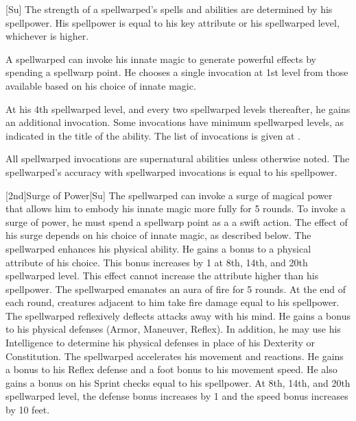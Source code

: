 [Su]
The strength of a spellwarped's spells and abilities are determined by his spellpower.
His spellpower is equal to his key attribute or his spellwarped level, whichever is higher.

A spellwarped can invoke his innate magic to generate powerful effects by spending a spellwarp point.
He chooses a single invocation at 1st level from those available based on his choice of innate magic.

At his 4th spellwarped level, and every two spellwarped levels thereafter, he gains an additional invocation.
Some invocations have minimum spellwarped levels, as indicated in the title of the ability.
The list of invocations is given at .

All spellwarped invocations are supernatural abilities unless otherwise noted.
The spellwarped's accuracy with spellwarped invocations is equal to his spellpower.

[2nd]{Surge of Power}[Su]
The spellwarped can invoke a surge of magical power that allows him to embody his innate magic more fully for 5 rounds.
To invoke a surge of power, he must spend a spellwarp point as a a swift action.
The effect of his surge depends on his choice of innate magic, as described below.
    The spellwarped enhances his physical ability.
    He gains a  bonus to a physical attribute of his choice.
    This bonus increases by 1 at 8th, 14th, and 20th spellwarped level.
    This effect cannot increase the attribute higher than his spellpower.
    The spellwarped emanates an aura of fire for 5 rounds.
    At the end of each round, creatures adjacent to him take fire damage equal to his spellpower.
    The spellwarped reflexively deflects attacks away with his mind.
    He gains a  bonus to his physical defenses (Armor, Maneuver, Reflex).
    In addition, he may use his Intelligence to determine his physical defenses in place of his Dexterity or Constitution.
    The spellwarped accelerates his movement and reactions.
    He gains a  bonus to his Reflex defense and a  foot bonus to his movement speed.
    He also gains a bonus on his Sprint checks equal to his spellpower.
    At 8th, 14th, and 20th spellwarped level, the defense bonus increases by 1 and the speed bonus increases by 10 feet.

